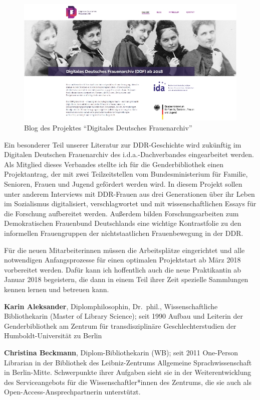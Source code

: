 \documentclass[a4paper,
fontsize=11pt,
oneside,
numbers=noperiodatend,
parskip=half-,
bibliography=totoc,
final
]{scrartcl}
\begin{document}
\begin{figure}
\centering
\includegraphics{img/Aleksander_3.jpg}
\caption{Blog des Projektes \enquote{Digitales Deutsches Frauenarchiv}}
\end{figure}

Ein besonderer Teil unserer Literatur zur DDR-Geschichte wird zukünftig
im Digitalen Deutschen Frauenarchiv des i.d.a.-Dachverbandes
eingearbeitet werden. Als Mitglied dieses Verbandes stellte ich für die
Genderbibliothek einen Projektantrag, der mit zwei Teilzeitstellen vom
Bundesministerium für Familie, Senioren, Frauen und Jugend gefördert
werden wird. In diesem Projekt sollen unter anderem Interviews mit
DDR-Frauen aus drei Generationen über ihr Leben im Sozialismus
digitalisiert, verschlagwortet und mit wissenschaftlichen Essays für die
Forschung aufbereitet werden. Außerdem bilden Forschungsarbeiten zum
Demokratischen Frauenbund Deutschlands eine wichtige Kontrastfolie zu
den informellen Frauengruppen der nichtstaatlichen Frauenbewegung in der
DDR.

Für die neuen Mitarbeiterinnen müssen die Arbeitsplätze eingerichtet und
alle notwendigen Anfangsprozesse für einen optimalen Projektstart ab
März 2018 vorbereitet werden. Dafür kann ich hoffentlich auch die neue
Praktikantin ab Januar 2018 begeistern, die dann in einem Teil ihrer
Zeit spezielle Sammlungen kennen lernen und betreuen kann.

\textbf{Karin Aleksander}, Diplomphilosophin, Dr.~phil.,
Wissenschaftliche Bibliothekarin (Master of Library Science); seit 1990
Aufbau und Leiterin der Genderbibliothek am Zentrum für
transdisziplinäre Geschlechterstudien der Humboldt-Universität zu Berlin

\textbf{Christina Beckmann}, Diplom-Bibliothekarin (WB); seit 2011
One-Person Librarian in der Bibliothek des Leibniz-Zentrums Allgemeine
Sprachwissenschaft in Berlin-Mitte. Schwerpunkte ihrer Aufgaben sieht
sie in der Weiterentwicklung des Serviceangebots für die
Wissenschaftler*innen des Zentrums, die sie auch als
Open-Access-Ansprechpartnerin unterstützt.
\end{document}
